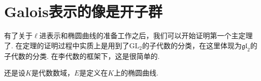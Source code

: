 \chapter{Galois表示的像是开子群}

有了关于$\ell$进表示和椭圆曲线的准备工作之后，我们可以开始证明第一个主定理了.
在定理的证明过程中实质上是用到了$\mathrm{GL}_2$的子代数的分类，在这里体现为$\mathfrak{gl}_2$的子代数的分类.
在李代数的框架下，这是很简单的.

还是设$K$是代数数域，$E$是定义在$K$上的椭圆曲线.


